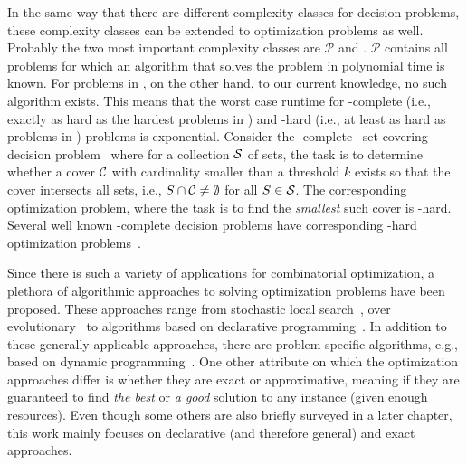 In the same way that there are different complexity classes for decision problems, these complexity classes can be extended to optimization problems as well.
Probably the two most important complexity classes are $\mathcal{P}$ and \NP.
$\mathcal{P}$ contains all problems for which an algorithm that solves the problem in polynomial time is known.
For problems in \NP, on the other hand, to our current knowledge, no such algorithm exists.
This means that the worst case runtime for \NP-complete (i.e., exactly as hard as the hardest problems in \NP) and \NP-hard (i.e., at least as hard as problems in \NP) problems is exponential.
Consider the \NP-complete~\autocite{} set covering decision problem~\autocite{DBLP:conf/coco/Karp72} where for a collection $\mathcal{S}$ of sets, the task is to determine whether a cover $\mathcal{C}$ with cardinality smaller than a threshold $k$ exists so that the cover intersects all sets, i.e., $S \cap \mathcal{C} \neq \emptyset$ for all $S\in\mathcal{S}$.
The corresponding optimization problem, where the task is to find the \emph{smallest} such cover is \NP-hard.
Several well known \NP-complete decision problems have corresponding \NP-hard optimization problems~\autocite{KorteVygen2018-15}.

Since there is such a variety of applications for combinatorial optimization, a plethora of algorithmic approaches to solving optimization problems have been proposed.
These approaches range from stochastic local search~\autocite{}, over evolutionary~\autocites{Dasgupta2013,DBLP:journals/jgo/StornP97} to algorithms based on declarative programming~\autocite{}.
In addition to these generally applicable approaches, there are problem specific algorithms, e.g., based on dynamic programming~\autocite{DBLP:conf/aaai/DemirovicS21}.
One other attribute on which the optimization approaches differ is whether they are exact or approximative, meaning if they are guaranteed to find \emph{the best} or \emph{a good} solution to any instance (given enough resources).
Even though some others are also briefly surveyed in a later chapter, this work mainly focuses on declarative (and therefore general) and exact approaches.


